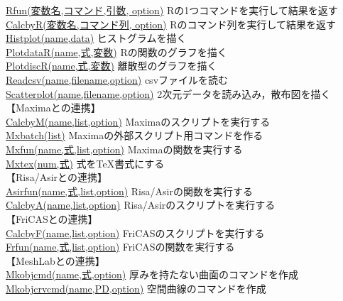 \documentclass[papersize,a4paper,12pt,uplatex]{jsarticle}
\begin{document}
\begin{tabbing}
\hyperlink{rfun}{Rfun(変数名,コマンド,引数, option)}  \>Rの1つコマンドを実行して結果を返す\\
\hyperlink{calcbyr}{CalcbyR(変数名,コマンド列, option)}  \>Rのコマンド列を実行して結果を返す\\
\hyperlink{histplot}{Histplot(name,data)}  \>ヒストグラムを描く\\
\hyperlink{plotdatar}{PlotdataR(name,式,変数)}  \>Rの関数のグラフを描く\\
\hyperlink{plotdiscr}{PlotdiscR(name,式,変数)}  \>離散型のグラフを描く\\
\hyperlink{readcsv}{Readcsv(name,filename,option)}  \>csvファイルを読む\\
\hyperlink{scatterplot}{Scatterplot(name,filename,option)}  \>2次元データを読み込み，散布図を描く\\
\vspace{\baselineskip}
【Maximaとの連携】\\
\hyperlink{calcbyM}{CalcbyM(name,list,option)}  \>Maximaのスクリプトを実行する\\
\hyperlink{mxbatch}{Mxbatch(list)}  \>Maximaの外部スクリプト用コマンドを作る\\
\hyperlink{mxfun}{Mxfun(name,式,list,option)}  \>Maximaの関数を実行する\\
\hyperlink{mxtex}{Mxtex(num,式)}  \>式をTeX書式にする\\
\vspace{\baselineskip}
【Risa/Asirとの連携】\\
\hyperlink{asirfun}{Asirfun(name,式,list,option)}  \>Risa/Asirの関数を実行する\\
\hyperlink{calcbyA}{CalcbyA(name,list,option)}  \>Risa/Asirのスクリプトを実行する\\
\vspace{\baselineskip}
【FriCASとの連携】\\
\hyperlink{calcbyF}{CalcbyF(name,list,option)}  \>FriCASのスクリプトを実行する\\
\hyperlink{frfun}{Frfun(name,式,list,option)}  \>FriCASの関数を実行する\\
\vspace{\baselineskip}
【MeshLabとの連携】\\
\hyperlink{mkobjcmd}{Mkobjcmd(name,式,option)} \>厚みを持たない曲面のコマンドを作成\\
\hyperlink{mkobjcrvcmd}{Mkobjcrvcmd(name,PD,option)} \>空間曲線のコマンドを作成\\

\end{tabbing}
\end{document}

